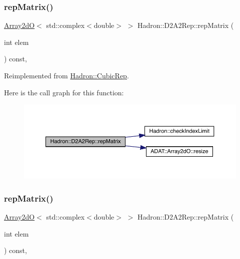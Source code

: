 \subsubsection{\texorpdfstring{repMatrix()}{repMatrix()}\hspace{0.1cm}{\footnotesize\ttfamily [1/3]}}
{\footnotesize\ttfamily \mbox{\hyperlink{classADAT_1_1Array2dO}{Array2dO}}$<$ std\+::complex$<$double$>$ $>$ Hadron\+::\+D2\+A2\+Rep\+::rep\+Matrix (\begin{DoxyParamCaption}\item[{int}]{elem }\end{DoxyParamCaption}) const\hspace{0.3cm}{\ttfamily [inline]}, {\ttfamily [virtual]}}



Reimplemented from \mbox{\hyperlink{structHadron_1_1CubicRep_ac5d7e9e6f4ab1158b5fce3e4ad9e8005}{Hadron\+::\+Cubic\+Rep}}.

Here is the call graph for this function\+:
\nopagebreak
\begin{figure}[H]
\begin{center}
\leavevmode
\includegraphics[width=350pt]{d2/dfc/structHadron_1_1D2A2Rep_a75e7a00548888c39a9e3613c4b5178ef_cgraph}
\end{center}
\end{figure}
\mbox{\label{structHadron_1_1D2A2Rep_a75e7a00548888c39a9e3613c4b5178ef}} 
\subsubsection{\texorpdfstring{repMatrix()}{repMatrix()}\hspace{0.1cm}{\footnotesize\ttfamily [2/3]}}
{\footnotesize\ttfamily \mbox{\hyperlink{classADAT_1_1Array2dO}{Array2dO}}$<$ std\+::complex$<$double$>$ $>$ Hadron\+::\+D2\+A2\+Rep\+::rep\+Matrix (\begin{DoxyParamCaption}\item[{int}]{elem }\end{DoxyParamCaption}) const\hspace{0.3cm}{\ttfamily [inline]}, {\ttfamily [virtual]}}



